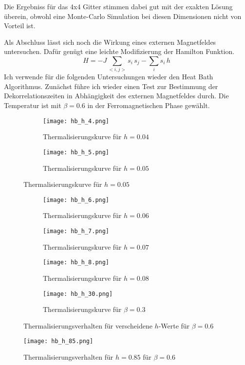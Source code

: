 \documentclass[12pt]{article}
\begin{document}
Die Ergebniss für das 4x4 Gitter stimmen dabei gut mit der exakten Lösung überein, obwohl eine Monte-Carlo Simulation bei diesen Dimensionen nicht von Vorteil ist.

Als Abschluss lässt sich noch die Wirkung eines externen Magnetfeldes untersuchen. Dafür genügt eine leichte Modifizierung der Hamilton Funktion.
$$H=-J\sum_{<i,j>}s_i\,s_j-\sum_is_i\,h$$
Ich verwende für die folgenden Untersuchungen wieder den Heat Bath Algorithmus. Zunächst führe ich wieder einen Test zur Bestimmung der Dekorrelationszeiten in Abhängigkeit des externen Magnetfeldes durch. Die Temperatur ist mit $\beta=0.6$ in der Ferromagnetischen Phase gewählt.
\vspace*{-4cm}\begin{figure}[H]\hspace*{-1.5cm}
    \begin{subfigure}{0.4\textwidth}
    \texttt{[image: hb\_h\_4.png]}
    \caption{Thermalisierungskurve für $h=0.04$}
    \end{subfigure}
    \hfill
    \begin{subfigure}{0.4\textwidth}
    \hspace*{-0.8cm}
    \texttt{[image: hb\_h\_5.png]}
    \caption{Thermalisierungskurve für $h=0.05$}
    \end{subfigure}
    \hfill
\end{figure}
\begin{figure}[H]
    \hspace*{-1.5cm}
    \begin{subfigure}{0.4\textwidth}
    \texttt{[image: hb\_h\_6.png]}
    \caption{Thermalisierungskurve für $h=0.06$}
    \end{subfigure}
    \hfill
    \begin{subfigure}{0.4\textwidth}
    \hspace*{-0.8cm}
    \texttt{[image: hb\_h\_7.png]}
    \caption{Thermalisierungskurve für $h=0.07$}
    \end{subfigure}
    \hfill
    \hspace*{-1.5cm}
    \begin{subfigure}{0.4\textwidth}
    \texttt{[image: hb\_h\_8.png]}
    \caption{Thermalisierungskurve für $h=0.08$}
    \end{subfigure}
    \hfill
    \begin{subfigure}{0.4\textwidth}
    \hspace*{-0.8cm}
    \texttt{[image: hb\_h\_30.png]}
    \caption{Thermalisierungskurve für $\beta=0.3$}
    \end{subfigure}
    \hfill
    \caption{Thermalisierungsverhalten für verscheidene $h$-Werte für \newline$\beta=0.6$}
    \end{figure}
    \begin{figure}[H]\centering\texttt{[image: hb\_h\_85.png]}\caption{Thermalisierungsverhalten für $h=0.85$ für $\beta=0.6$}\end{figure}
\end{document}
